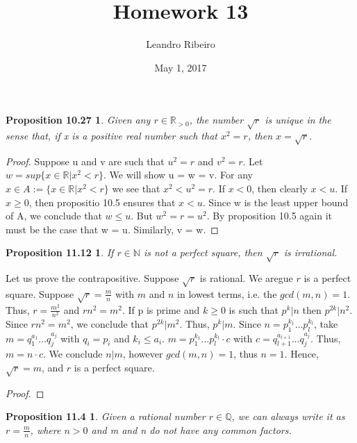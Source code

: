 \documentclass[12pt]{amsart}
\newcommand{\N}{\mathbb{N}}
\newcommand{\R}{\mathbb{R}}
\newcommand{\Q}{\mathbb{Q}}
\begin{document}
\title{Homework 13}
\date{May 1, 2017}
\author{Leandro Ribeiro}

\maketitle

\newtheorem*{prop10.27}{Proposition 10.27}
\begin{prop10.27}
	Given any $r \in \R_{>0}$, the number $\sqrt{r}$ is unique in the sense that, if x is a positive real number such that $x^2 = r$, then $x = \sqrt{r}$.
\end{prop10.27}

\begin{proof}
	Suppose u and v are such that $u^2 = r$ and $v^2 = r$. Let $w = sup\{x \in \R | x^2 < r\}$. We will show u = w = v. For any $x \in A := \{x \in \R | x^2 < r\}$ we see that $x^2 < u^2 = r$. If $x < 0$, then clearly $x < u$. If $x \geq 0$, then propositio 10.5 ensures that $x < u$. Since w is the least upper bound of A, we conclude that $w \leq u$. But $w^2 = r = u^2$. By proposition 10.5 again it must be the case that w = u. Similarly, v = w.
\end{proof}

\newtheorem*{prop11.12}{Proposition 11.12}

\begin{prop11.12}
	If $r \in \N$ is not a perfect square, then $\sqrt{r}$ is irrational.
\end{prop11.12}
Let us prove the contrapositive. Suppose $\sqrt{r}$ is rational. We aregue $r$ is a perfect square. Suppose $\sqrt{r} = \frac{m}{n}$ with $m$ and $n$ in lowest terms, i.e. the $gcd(m,n)=1$. Thus, $r=\frac{m^2}{n^2}$ and $rn^2 = m^2$. If p is prime and $k \geq 0$ is such that $p^k|n$ then $p^{2k}|n^2$. Since $rn^2 = m^2$, we conclude that $p^{2k}|m^2$. Thus, $p^k|m$. Since $n = p_1^{k_1}\dots p_l^{k_l}$, take $m = q_1^{a_1}\dots q_j^{a_j}$ with $q_i=p_i$ and $k_i \leq a_i$. $m = p_1^{k_1} \dots p_l^{k_l} \cdot c$ with $c = q_{l+1}^{a_{l+1}} \dots q_{j}^{a_j}$. Thus, $m = n \cdot c$. We conclude $n | m$, however $gcd(m,n)=1$, thus $n=1$. Hence, $\sqrt{r} = m$, and $r$ is a perfect square.
\begin{proof}

\end{proof}

\newtheorem*{prop11.4}{Proposition 11.4}
\begin{prop11.4}
	Given a rational number $r \in \Q$, we can always write it as $r = \frac{m}{n}$, where $n > 0$ and m and n do not have any common factors.
\end{prop11.4}
\end{document}
